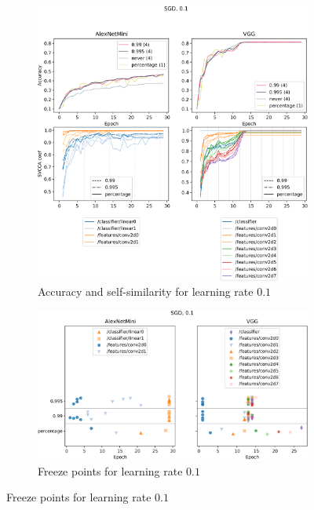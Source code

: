 \begin{figure}
    \centering
    \caption{Layer convergence experiment with learning rate $0.1$}
    \label{fig:saturation_alexnet_vgg_sgd_01}
    \begin{subfigure}{\textwidth}
        \includegraphics[width=\linewidth]{gfx/diagrams/experiments/saturation/acc_sim_alexnetmini_vgg_sgd_01.pdf}
        \caption{Accuracy and self-similarity for learning rate $0.1$}
        \label{fig:saturation_alexnet_vgg_sgd_001_similarity}
    \end{subfigure}

    \begin{subfigure}{\textwidth}
        \includegraphics[width=\linewidth]{gfx/diagrams/experiments/saturation/convergence_alexnetmini_vgg_sgd_01.pdf}
        \caption{Freeze points for learning rate $0.1$}
        \label{fig:saturation_alexnet_vgg_sgd_01_convergence}
    \end{subfigure}
\end{figure}

